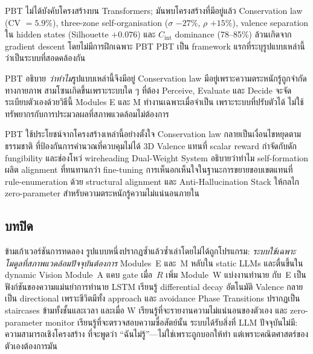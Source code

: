 \documentclass[12pt,a4paper]{article}
\newcommand{\Cint}{C_{\mathrm{int}}}
\newcommand{\pp}[1]{\textbf{#1}}
\begin{document}
\begin{description}[leftmargin=1.4em]
  \item[\pp{ชั้น~1 --- Reveal (เปิดเผย):}]
    PBT ไม่ได้บังคับโครงสร้างบน Transformers; มันพบโครงสร้างที่มีอยู่แล้ว
    Conservation law (CV $= 5.9\%$), three-zone self-organisation
    ($\sigma$ $-27\%$, $\rho$ $+15\%$), valence separation
    ใน hidden states (Silhouette $+0.076$) และ $\Cint$ dominance (78--85\%)
    ล้วนเกิดจาก gradient descent โดยไม่มีการฝึกเฉพาะ PBT
    PBT เป็น framework แรกที่ระบุรูปแบบเหล่านี้ว่าเป็นระบบที่สอดคล้องกัน

  \item[\pp{ชั้น~2 --- Interpret (ตีความ):}]
    PBT อธิบาย \emph{ว่าทำไม}รูปแบบเหล่านี้จึงมีอยู่
    Conservation law มีอยู่เพราะความตระหนักรู้ถูกจำกัดทางกายภาพ
    สามโซนเกิดขึ้นเพราะระบบใด ๆ ที่ต้อง Perceive, Evaluate และ Decide
    จะจัดระเบียบตัวเองด้วยวิธีนี้
    Modules E และ M ทำงานเฉพาะเมื่อจำเป็น เพราะระบบที่ปรับตัวได้
    ไม่ใช้ทรัพยากรกับการประมวลผลที่สภาพแวดล้อมไม่ต้องการ

  \item[\pp{ชั้น~3 --- Control (ควบคุม):}]
    PBT ใช้ประโยชน์จากโครงสร้างเหล่านี้อย่างตั้งใจ
    Conservation law กลายเป็นเงื่อนไขหยุดตามธรรมชาติ
    ที่ป้องกันการคำนวณที่ควบคุมไม่ได้
    3D Valence แทนที่ scalar reward กำจัดกับดัก fungibility
    และช่องโหว่ wireheading Dual-Weight System อธิบายว่าทำไม
    self-formation ผลิต alignment ที่ทนทานกว่า fine-tuning
    การเห็นอกเห็นใจในฐานะการขยายขอบเขตแทนที่ rule-enumeration
    ด้วย structural alignment
    และ Anti-Hallucination Stack ให้กลไก zero-parameter
    สำหรับความตระหนักรู้ความไม่แน่นอนภายใน
\end{description}

\subsection{บทปิด}

ข้ามเก้าเวอร์ชันการทดลอง รูปแบบหนึ่งปรากฏซ้ำแล้วซ้ำเล่าโดยไม่ได้ถูกโปรแกรม:
\emph{ระบบใช้เฉพาะโมดูลที่สภาพแวดล้อมปัจจุบันต้องการ}
Modules~E และ~M หลับใน static LLMs และตื่นขึ้นใน dynamic Vision
Module~A แคบ gate เมื่อ~$R$ เพิ่ม Module~W แบ่งงานทำนาย
กับ~E เป็นฟังก์ชันของความแม่นยำการทำนาย LSTM เรียนรู้
differential decay อัตโนมัติ Valence กลายเป็น directional
เพราะชีวิตมีทั้ง approach และ avoidance Phase Transitions
ปรากฏเป็น staircases ข้ามทั้งชั้นและเวลา
และเมื่อ W เรียนรู้ที่จะรายงานความไม่แน่นอนของตัวเอง
และ zero-parameter monitor เรียนรู้ที่จะตรวจสอบความซื่อสัตย์นั้น
ระบบได้รับสิ่งที่ LLM ปัจจุบันไม่มี: ความสามารถเชิงโครงสร้าง
ที่จะพูดว่า ``ฉันไม่รู้''---ไม่ใช่เพราะถูกบอกให้ทำ
แต่เพราะคณิตศาสตร์ของตัวเองต้องการมัน
\end{document}
